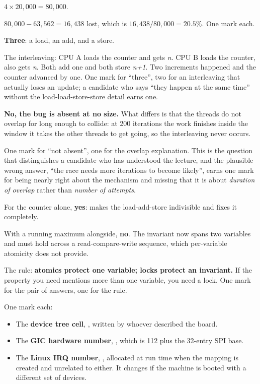 $4 \times 20{,}000 = 80{,}000$.

$80{,}000 - 63{,}562 = 16{,}438$ lost, which is $16{,}438 / 80{,}000 = 20.5\%$. One mark each.

\textbf{Three}: a load, an add, and a store.

The interleaving: CPU A loads the counter and gets \emph{n}. CPU B loads the counter, also gets
\emph{n}. Both add one and both store \emph{n+1}. Two increments happened and the counter advanced
by one. One mark for ``three'', two for an interleaving that actually loses an update; a candidate
who says ``they happen at the same time'' without the load-load-store-store detail earns one.

\textbf{No, the bug is absent at no size.} What differs is that the threads do not overlap for long
enough to collide: at 200 iterations the work finishes inside the window it takes the other threads
to get going, so the interleaving never occurs.

One mark for ``not absent'', one for the overlap explanation. This is the question that
distinguishes a candidate who has understood the lecture, and the plausible wrong answer, ``the race
needs more iterations to become likely'', earns one mark for being nearly right about the mechanism
and missing that it is about \emph{duration of overlap} rather than \emph{number of attempts}.

For the counter alone, \textbf{yes}:  makes the load-add-store indivisible and
fixes it completely.

With a running maximum alongside, \textbf{no}. The invariant now spans two variables and must hold
across a read-compare-write sequence, which per-variable atomicity does not provide.

The rule: \textbf{atomics protect one variable; locks protect an invariant.} If the property you
need mentions more than one variable, you need a lock. One mark for the pair of answers, one for the
rule.


One mark each:
\begin{itemize}
  \item The \textbf{device tree cell}, , written by whoever described the board.
  \item The \textbf{GIC hardware number}, , which is 112 plus the 32-entry SPI base.
  \item The \textbf{Linux IRQ number}, , allocated at run time when the mapping is created
    and unrelated to either. It changes if the machine is booted with a different set of devices.
\end{itemize}

